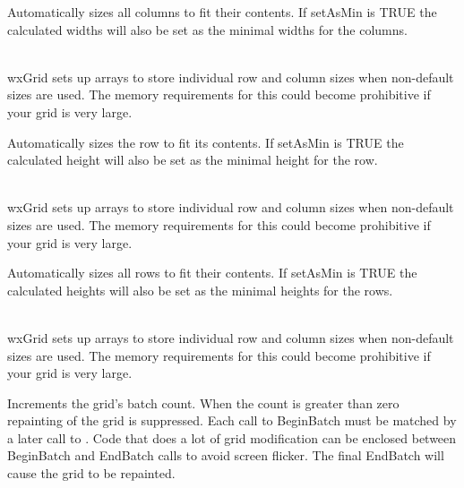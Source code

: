 
Automatically sizes all columns to fit their contents.  If setAsMin is TRUE the calculated widths will
also be set as the minimal widths for the columns.

 \\
wxGrid sets up arrays to store individual row and column sizes when non-default sizes are used.
The memory requirements for this could become prohibitive if your grid is very large. 

\label{wxgridautosizerow}


Automatically sizes the row to fit its contents.  If setAsMin is TRUE the calculated height will
also be set as the minimal height for the row.

 \\
wxGrid sets up arrays to store individual row and column sizes when non-default sizes are used.
The memory requirements for this could become prohibitive if your grid is very large. 

\label{wxgridautosizerows}


Automatically sizes all rows to fit their contents.  If setAsMin is TRUE the calculated heights will
also be set as the minimal heights for the rows.

 \\
wxGrid sets up arrays to store individual row and column sizes when non-default sizes are used.
The memory requirements for this could become prohibitive if your grid is very large. 

\label{wxgridbeginbatch}


Increments the grid's batch count. When the count is greater than zero repainting of
the grid is suppressed. Each call to BeginBatch must be matched by a later call to 
. Code that does a lot of grid
modification can be enclosed between BeginBatch and EndBatch calls to avoid
screen flicker. The final EndBatch will cause the grid to be repainted.

\label{wxgridcandragcolsize}

